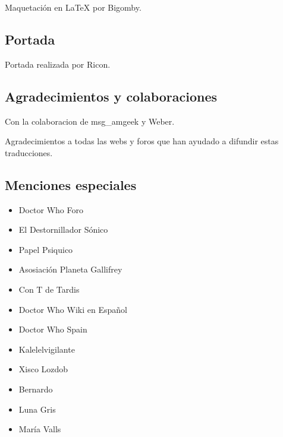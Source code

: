 \begin{multicols}{2}
Maquetación en LaTeX por Bigomby.

\subsection*{Portada}\label{portada}

Portada realizada por Ricon.

\subsection*{Agradecimientos y
colaboraciones}\label{agradecimientos-y-colaboraciones}

Con la colaboracion de msg\_amgeek y Weber.

Agradecimientos a todas las webs y foros que han ayudado a difundir
estas traducciones.

\subsection*{Menciones especiales}\label{menciones-especiales}

\begin{itemize}
\itemsep1pt\parskip0pt
\item
  Doctor Who Foro
\item
  El Destornillador Sónico
\item
  Papel Psiquico
\item
  Asosiación Planeta Gallifrey
\item
  Con T de Tardis
\item
  Doctor Who Wiki en Español
\item
  Doctor Who Spain
\item
  Kalelelvigilante
\item
  Xisco Lozdob
\item
  Bernardo
\item
  Luna Gris
\item
  María Valls
\end{itemize}

\end{multicols}
\endgroup